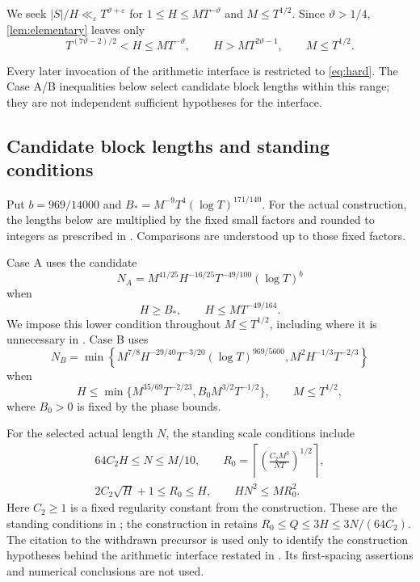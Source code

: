 \documentclass[11pt,reqno]{amsart}
\numberwithin{equation}{section}
\theoremstyle{definition}
\theoremstyle{remark}
\newcommand{\eps}{\varepsilon}
\newcommand{\vth}{\vartheta}
\newcommand{\blocklog}{b}
\begin{document}
We seek $|S|/H\ll_\eps T^{\vth+\eps}$ for
$1\le H\le MT^{-\vth}$ and $M\le T^{1/2}$.
Since $\vth>1/4$, \cref{lem:elementary} leaves only
\begin{equation}\label{eq:hard}
 T^{(7\vth-2)/2}<H\le MT^{-\vth},\qquad
 H>MT^{2\vth-1},\qquad M\le T^{1/2}.
\end{equation}


Every later invocation of the arithmetic interface is restricted to \eqref{eq:hard}. The Case A/B inequalities below select candidate block lengths within this range; they are not independent sufficient hypotheses for the interface.

\subsection{Candidate block lengths and standing conditions}
Put $\blocklog=969/14000$ and $B_*=M^{-9}T^4(\log T)^{171/140}$.
For the actual construction, the lengths below are multiplied by the fixed small factors and rounded to integers as prescribed in \cite{LY}. Comparisons are understood up to those fixed factors.

Case A uses the candidate
\begin{equation}\label{eq:NA}
 N_A=M^{41/25}H^{-16/25}T^{-49/100}(\log T)^{\blocklog}
\end{equation}
when
\begin{equation}\label{eq:caseA}
 H\ge B_*,\qquad H\le MT^{-49/164}.
\end{equation}
We impose this lower condition throughout $M\le T^{1/2}$, including where it is unnecessary in \cite{LY}.
Case B uses
\begin{equation}\label{eq:NB}
 N_B=\min\left\{
 M^{7/8}H^{-29/40}T^{-3/20}(\log T)^{969/5600},
 M^2H^{-1/3}T^{-2/3}\right\}
\end{equation}
when
\begin{equation}\label{eq:caseB}
 H\le\min\{M^{35/69}T^{-2/23},B_0M^{3/2}T^{-1/2}\},
 \qquad M\le T^{1/2},
\end{equation}
where $B_0>0$ is fixed by the phase bounds.

For the selected actual length $N$, the standing scale conditions include
\begin{gather}
 64C_2H\le N\le M/10,\qquad
 R_0=\left\lceil\left(\frac{C_2M^3}{NT}\right)^{1/2}\right\rceil,
 \label{eq:standingN}\\
 2C_2\sqrt H+1\le R_0\le H,\qquad HN^2\le MR_0^2.
 \label{eq:standing}
\end{gather}
Here $C_2\ge1$ is a fixed regularity constant from the construction.
These are the standing conditions in \cite[(5.2)--(5.5)]{BW17}; the construction in \cite[(4.12)--(4.13)]{LY} retains $R_0\le Q\le3H\le3N/(64C_2)$.
The citation to the withdrawn precursor is used only to identify the construction hypotheses behind the arithmetic interface restated in \cite{LY}. Its first-spacing assertions and numerical conclusions are not used.
\end{document}
